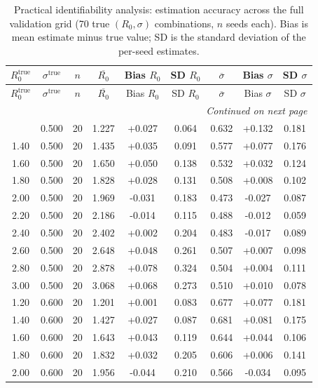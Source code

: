 \begin{longtable}{ccccccccc}
\caption{Practical identifiability analysis: estimation accuracy across the full validation grid (70 true $(R_0,\sigma)$ combinations, $n$ seeds each). Bias is mean estimate minus true value; SD is the standard deviation of the per-seed estimates.} \label{tab:s1_identifiability} \\
\hline
$R_0^{\text{true}}$ & $\sigma^{\text{true}}$ & $n$ & $\overline{R_0}$ & Bias $R_0$ & SD $R_0$ & $\overline{\sigma}$ & Bias $\sigma$ & SD $\sigma$ \\
\hline
\endfirsthead
\hline
$R_0^{\text{true}}$ & $\sigma^{\text{true}}$ & $n$ & $\overline{R_0}$ & Bias $R_0$ & SD $R_0$ & $\overline{\sigma}$ & Bias $\sigma$ & SD $\sigma$ \\
\hline
\endhead
\hline \multicolumn{9}{r}{\textit{Continued on next page}} \\
\endfoot
\hline
\endlastfoot
1.20 & 0.500 & 20 & 1.227 & +0.027 & 0.064 & 0.632 & +0.132 & 0.181 \\
1.40 & 0.500 & 20 & 1.435 & +0.035 & 0.091 & 0.577 & +0.077 & 0.176 \\
1.60 & 0.500 & 20 & 1.650 & +0.050 & 0.138 & 0.532 & +0.032 & 0.124 \\
1.80 & 0.500 & 20 & 1.828 & +0.028 & 0.131 & 0.508 & +0.008 & 0.102 \\
2.00 & 0.500 & 20 & 1.969 & -0.031 & 0.183 & 0.473 & -0.027 & 0.087 \\
2.20 & 0.500 & 20 & 2.186 & -0.014 & 0.115 & 0.488 & -0.012 & 0.059 \\
2.40 & 0.500 & 20 & 2.402 & +0.002 & 0.204 & 0.483 & -0.017 & 0.089 \\
2.60 & 0.500 & 20 & 2.648 & +0.048 & 0.261 & 0.507 & +0.007 & 0.098 \\
2.80 & 0.500 & 20 & 2.878 & +0.078 & 0.324 & 0.504 & +0.004 & 0.111 \\
3.00 & 0.500 & 20 & 3.068 & +0.068 & 0.273 & 0.510 & +0.010 & 0.078 \\
1.20 & 0.600 & 20 & 1.201 & +0.001 & 0.083 & 0.677 & +0.077 & 0.181 \\
1.40 & 0.600 & 20 & 1.427 & +0.027 & 0.087 & 0.681 & +0.081 & 0.175 \\
1.60 & 0.600 & 20 & 1.643 & +0.043 & 0.119 & 0.644 & +0.044 & 0.106 \\
1.80 & 0.600 & 20 & 1.832 & +0.032 & 0.205 & 0.606 & +0.006 & 0.141 \\
2.00 & 0.600 & 20 & 1.956 & -0.044 & 0.210 & 0.566 & -0.034 & 0.095 \\

\end{longtable}
